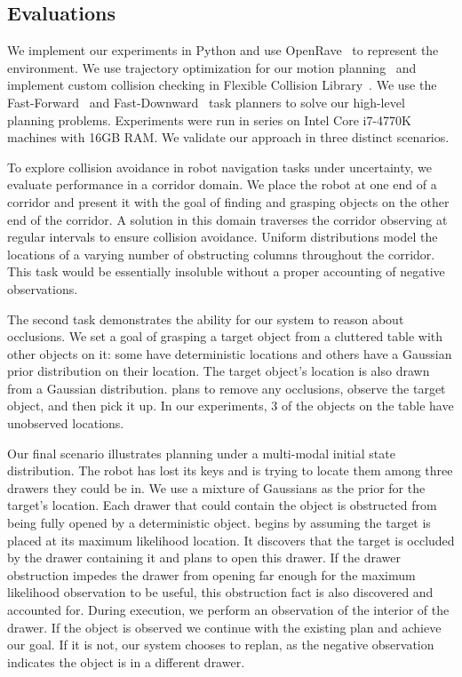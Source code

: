 \subsection{Evaluations}
We implement our experiments in Python and use
OpenRave~\cite{Diankov_2008_6117} to represent the environment. We use
trajectory optimization for our motion
planning~\cite{schulman2013finding} and implement custom collision
checking in Flexible Collision Library~\cite{jia2014fcl}. We use the
Fast-Forward~\cite{FF} and Fast-Downward~\cite{helmert2006fast} task
planners to solve our high-level planning problems. Experiments were
run in series on Intel Core i7-4770K machines with 16GB RAM. We
validate our approach in three distinct scenarios.

To explore collision avoidance in robot navigation tasks under
uncertainty, we evaluate performance in a corridor domain. We place
the robot at one end of a corridor and present it with the goal of
finding and grasping objects on the other end of the corridor.  A
solution in this domain traverses the corridor observing at regular
intervals to ensure collision avoidance. Uniform distributions model
the locations of a varying number of obstructing columns throughout
the corridor. This task would be essentially insoluble
without a proper accounting of negative observations.

The second task demonstrates the ability for our system to reason
about occlusions. We set a goal of grasping a target object from a
cluttered table with other objects on it: some have deterministic
locations and others have a Gaussian prior distribution on their
location. The target object's location is also drawn from a Gaussian
distribution. \ibsp{} plans to remove any occlusions, observe the
target object, and then pick it up. In our experiments, 3 of the
objects on the table have unobserved locations.

Our final scenario illustrates planning under a multi-modal initial
state distribution. The robot has lost its keys and is trying to
locate them among three drawers they could be in.  We use a mixture of
Gaussians as the prior for the target's location. Each drawer that
could contain the object is obstructed from being fully opened by a
deterministic object. \ibsp{} begins by assuming the target is placed
at its maximum likelihood location. It discovers that the target is
occluded by the drawer containing it and plans to open this drawer. If
the drawer obstruction impedes the drawer from opening far enough for
the maximum likelihood observation to be useful, this obstruction fact
is also discovered and accounted for. During execution, we perform an
observation of the interior of the drawer. If the object is observed
we continue with the existing plan and achieve our goal. If it is not,
our system chooses to replan, as the negative observation indicates
the object is in a different drawer.

